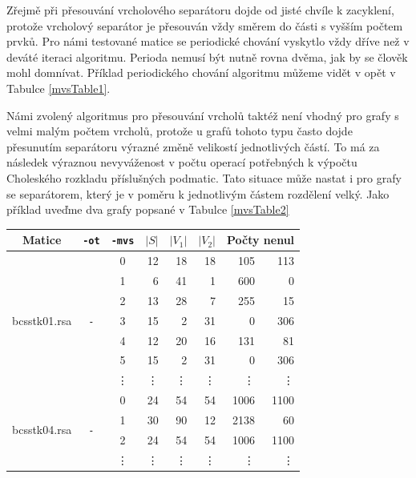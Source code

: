 \documentclass{ctuthesis}
\theoremstyle{plain}
\theoremstyle{definition}
\begin{document}
Zřejmě při přesouvání vrcholového separátoru dojde od jisté chvíle k zacyklení, protože vrcholový separátor je přesouván vždy směrem do části s vyšším počtem prvků. Pro námi testované matice se periodické chování vyskytlo vždy dříve než v deváté iteraci algoritmu. Perioda nemusí být nutně rovna dvěma, jak by se člověk mohl domnívat. Příklad periodického chování algoritmu můžeme vidět v opět v Tabulce \ref{mvsTable1}.

Námi zvolený algoritmus pro přesouvání vrcholů taktéž není vhodný pro grafy s velmi malým počtem vrcholů, protože u grafů tohoto typu často dojde přesunutím separátoru výrazné změně velikostí jednotlivých částí. To má za následek výraznou nevyváženost v počtu operací potřebných k výpočtu Choleského rozkladu příslušných podmatic. Tato situace může nastat i pro grafy se separátorem, který je v poměru k jednotlivým částem rozdělení velký. Jako příklad uveďme dva grafy popsané v Tabulce \ref{mvsTable2}

\bigskip
{\noindent
  \footnotesize
  \centering
  \renewcommand{\arraystretch}{1.15}
\begin{tabular}{|l|c|c|r|r|r|r|r|}
  \hline
  \multicolumn{1}{|c|}{Matice} & \multicolumn{1}{|c|}{\texttt{-ot}}  &\multicolumn{1}{|c|}{\texttt{-mvs}} &\multicolumn{1}{|c|}{$|S|$} & \multicolumn{1}{|c|}{$|V_1|$}& \multicolumn{1}{|c|}{$|V_2|$} & \multicolumn{2}{c|}{Počty nenul} \\
  \hline
    \multirow{7}{*}{bcsstk01.rsa}
      & \multirow{7}{*}{\texttt{-}} & 0
      & 12 & 18 & 18 & 105 & 113 \\
      & & 1  
      &	6	&	41	&	1	&	600	&	0	\\
      & & 2
      &	13	&	28	&	7	&	255	&	15	\\
      & & 3
      &	15	&	2	&	31	&	0	&	306	\\
      & & 4
      &	12	&	20	&	16	&	131	&	81	\\
      & & 5
      &	15	&	2	&	31	&	0	&	306	\\
      & & \vdots
      &	\vdots	&	\vdots	&	\vdots	&	\vdots	&	\vdots	\\
    \hline
    \multirow{4}{*}{bcsstk04.rsa}
      & \multirow{4}{*}{\texttt{-}} & 0
      &	24	&	54	&	54	&	1006	&	1100	\\
      & & 1   
      &	30	&	90	&	12	&	2138	&	60	\\
      & & 2
      &	24	&	54	&	54	&	1006	&	1100	\\
      & & \vdots
      &	\vdots	&	\vdots	&	\vdots	&	\vdots	&	\vdots	\\
    \hline
\end{tabular}
}
\end{document}
